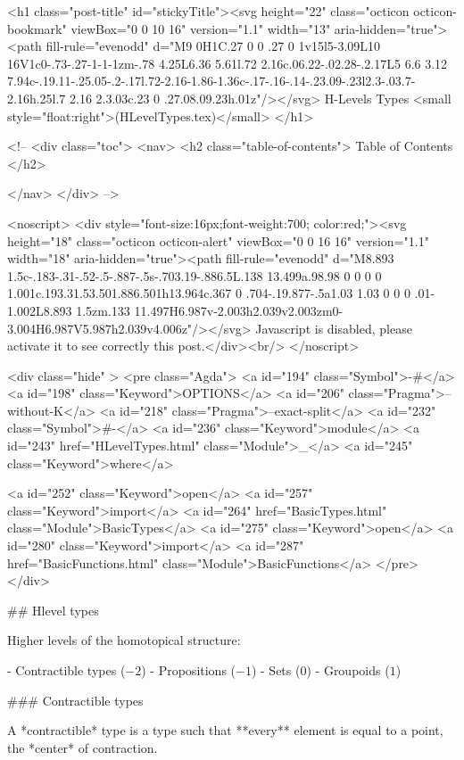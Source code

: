   <h1 class="post-title" id="stickyTitle"><svg height="22" class="octicon octicon-bookmark" viewBox="0 0 10 16" version="1.1" width="13" aria-hidden="true"><path fill-rule="evenodd" d="M9 0H1C.27 0 0 .27 0 1v15l5-3.09L10 16V1c0-.73-.27-1-1-1zm-.78 4.25L6.36 5.61l.72 2.16c.06.22-.02.28-.2.17L5 6.6 3.12 7.94c-.19.11-.25.05-.2-.17l.72-2.16-1.86-1.36c-.17-.16-.14-.23.09-.23l2.3-.03.7-2.16h.25l.7 2.16 2.3.03c.23 0 .27.08.09.23h.01z"/></svg> H-Levels Types <small style="float:right">(HLevelTypes.tex)</small>
  </h1>

  <!-- 
  <div class="toc">
    <nav>
    <h2 class="table-of-contents"> Table of Contents </h2>
      

    </nav>
  </div>
   -->

  <noscript>
  <div style="font-size:16px;font-weight:700; color:red;"><svg height="18" class="octicon octicon-alert" viewBox="0 0 16 16" version="1.1" width="18" aria-hidden="true"><path fill-rule="evenodd" d="M8.893 1.5c-.183-.31-.52-.5-.887-.5s-.703.19-.886.5L.138 13.499a.98.98 0 0 0 0 1.001c.193.31.53.501.886.501h13.964c.367 0 .704-.19.877-.5a1.03 1.03 0 0 0 .01-1.002L8.893 1.5zm.133 11.497H6.987v-2.003h2.039v2.003zm0-3.004H6.987V5.987h2.039v4.006z"/></svg> Javascript is disabled, please activate it to see correctly this post.</div><br/>
  </noscript>

  <div class="hide" >
<pre class="Agda">
<a id="194" class="Symbol">{-#</a> <a id="198" class="Keyword">OPTIONS</a> <a id="206" class="Pragma">--without-K</a> <a id="218" class="Pragma">--exact-split</a> <a id="232" class="Symbol">#-}</a>
<a id="236" class="Keyword">module</a> <a id="243" href="HLevelTypes.html" class="Module">_</a> <a id="245" class="Keyword">where</a>

<a id="252" class="Keyword">open</a> <a id="257" class="Keyword">import</a> <a id="264" href="BasicTypes.html" class="Module">BasicTypes</a>
<a id="275" class="Keyword">open</a> <a id="280" class="Keyword">import</a> <a id="287" href="BasicFunctions.html" class="Module">BasicFunctions</a>
</pre>
</div>


## Hlevel types

Higher levels of the homotopical structure:

- Contractible types ($-2$)
- Propositions ($-1$)
- Sets ($0$)
- Groupoids ($1$)

### Contractible types

A *contractible* type is a type such that **every**
element is equal to a point, the *center* of contraction.


